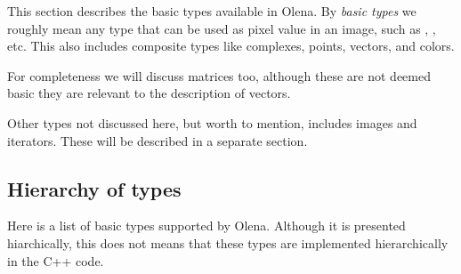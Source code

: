 
This section describes the basic types available in Olena.  By
\emph{basic types} we roughly mean any type that can be used as pixel
value in an image, such as , , etc.  This also
includes composite types like complexes, points, vectors, and colors.

For completeness we will discuss matrices too, although these are not
deemed basic they are relevant to the description of vectors.

Other types not discussed here, but worth to mention, includes
images and iterators.  These will be described in a separate section.


\subsection{Hierarchy of types}

Here is a list of basic types supported by Olena.  Although it is
presented hiarchically, this does not means that these types are
implemented hierarchically in the C++ code.


